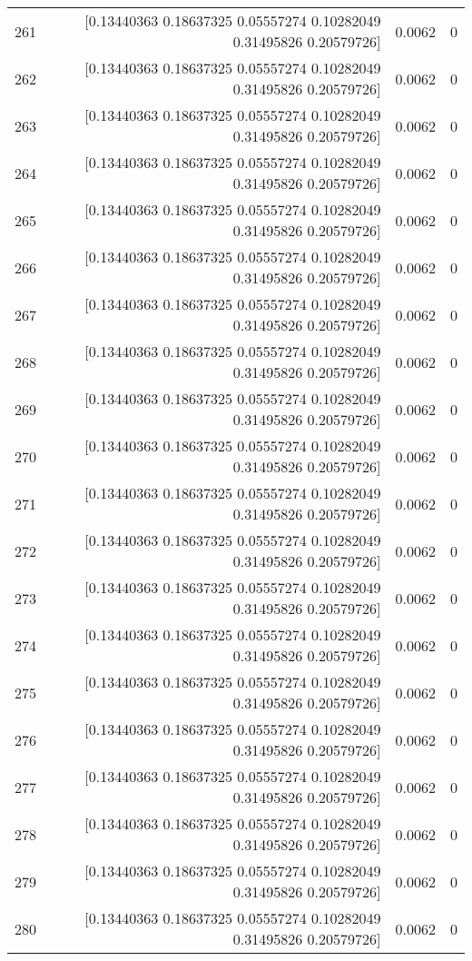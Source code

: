 \begin{longtable}{lrrr}
261 & [0.13440363 0.18637325 0.05557274 0.10282049 0.31495826 0.20579726] & 0.0062 & 0 \\
262 & [0.13440363 0.18637325 0.05557274 0.10282049 0.31495826 0.20579726] & 0.0062 & 0 \\
263 & [0.13440363 0.18637325 0.05557274 0.10282049 0.31495826 0.20579726] & 0.0062 & 0 \\
264 & [0.13440363 0.18637325 0.05557274 0.10282049 0.31495826 0.20579726] & 0.0062 & 0 \\
265 & [0.13440363 0.18637325 0.05557274 0.10282049 0.31495826 0.20579726] & 0.0062 & 0 \\
266 & [0.13440363 0.18637325 0.05557274 0.10282049 0.31495826 0.20579726] & 0.0062 & 0 \\
267 & [0.13440363 0.18637325 0.05557274 0.10282049 0.31495826 0.20579726] & 0.0062 & 0 \\
268 & [0.13440363 0.18637325 0.05557274 0.10282049 0.31495826 0.20579726] & 0.0062 & 0 \\
269 & [0.13440363 0.18637325 0.05557274 0.10282049 0.31495826 0.20579726] & 0.0062 & 0 \\
270 & [0.13440363 0.18637325 0.05557274 0.10282049 0.31495826 0.20579726] & 0.0062 & 0 \\
271 & [0.13440363 0.18637325 0.05557274 0.10282049 0.31495826 0.20579726] & 0.0062 & 0 \\
272 & [0.13440363 0.18637325 0.05557274 0.10282049 0.31495826 0.20579726] & 0.0062 & 0 \\
273 & [0.13440363 0.18637325 0.05557274 0.10282049 0.31495826 0.20579726] & 0.0062 & 0 \\
274 & [0.13440363 0.18637325 0.05557274 0.10282049 0.31495826 0.20579726] & 0.0062 & 0 \\
275 & [0.13440363 0.18637325 0.05557274 0.10282049 0.31495826 0.20579726] & 0.0062 & 0 \\
276 & [0.13440363 0.18637325 0.05557274 0.10282049 0.31495826 0.20579726] & 0.0062 & 0 \\
277 & [0.13440363 0.18637325 0.05557274 0.10282049 0.31495826 0.20579726] & 0.0062 & 0 \\
278 & [0.13440363 0.18637325 0.05557274 0.10282049 0.31495826 0.20579726] & 0.0062 & 0 \\
279 & [0.13440363 0.18637325 0.05557274 0.10282049 0.31495826 0.20579726] & 0.0062 & 0 \\
280 & [0.13440363 0.18637325 0.05557274 0.10282049 0.31495826 0.20579726] & 0.0062 & 0 \\

\end{longtable}
